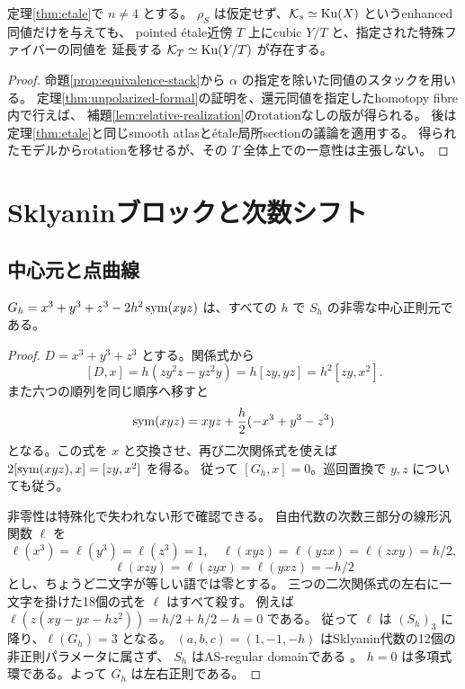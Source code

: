 \begin{corollary}[rotationを指定しない局所的存在]\label{cor:etale-unpolarized}
 定理\ref{thm:etale}で \(n\ne4\) とする。
 \(\rho_S\) は仮定せず、\(\mathcal K_s\simeq\operatorname{Ku}(X)\) というenhanced同値だけを与えても、
 pointed étale近傍 \(T\) 上にcubic \(Y/T\) と、指定された特殊ファイバーの同値を
 延長する \(\mathcal K_T\simeq\operatorname{Ku}(Y/T)\) が存在する。
\end{corollary}
\begin{proof}
 命題\ref{prop:equivalence-stack}から \(\alpha\) の指定を除いた同値のスタックを用いる。
 定理\ref{thm:unpolarized-formal}の証明を、還元同値を指定したhomotopy fibre内で行えば、
 補題\ref{lem:relative-realization}のrotationなしの版が得られる。
 後は定理\ref{thm:etale}と同じsmooth atlasとétale局所sectionの議論を適用する。
 得られたモデルからrotationを移せるが、その \(T\) 全体上での一意性は主張しない。
\end{proof}

\section{Sklyaninブロックと次数シフト}\label{sec:elliptic}

\subsection{中心元と点曲線}

\begin{lemma}\label{lem:center}
 \(G_h=x^3+y^3+z^3-2h^2\operatorname{sym}(xyz)\) は、すべての \(h\) で
 \(S_h\) の非零な中心正則元である。
\end{lemma}
\begin{proof}
 \(D=x^3+y^3+z^3\) とする。関係式から
 \[
 [D,x]=h(zy^2z-yz^2y)=h[zy,yz]=h^2[zy,x^2].
 \]
 また六つの順列を同じ順序へ移すと
 \[
 \operatorname{sym}(xyz)=xyz+\frac h2(-x^3+y^3-z^3)
 \]
 となる。この式を \(x\) と交換させ、再び二次関係式を使えば
 \(2[\operatorname{sym}(xyz),x]=[zy,x^2]\) を得る。
 従って \([G_h,x]=0\)。巡回置換で \(y,z\) についても従う。

 非零性は特殊化で失われない形で確認できる。
 自由代数の次数三部分の線形汎関数 \(\ell\) を
 \[
 \ell(x^3)=\ell(y^3)=\ell(z^3)=1,\quad
 \ell(xyz)=\ell(yzx)=\ell(zxy)=h/2,
 \]
 \[
 \ell(xzy)=\ell(zyx)=\ell(yxz)=-h/2
 \]
 とし、ちょうど二文字が等しい語では零とする。
 三つの二次関係式の左右に一文字を掛けた18個の式を \(\ell\) はすべて殺す。
 例えば \(\ell(z(xy-yx-hz^2))=h/2+h/2-h=0\) である。
 従って \(\ell\) は \((S_h)_3\) に降り、\(\ell(G_h)=3\) となる。
 \((a,b,c)=(1,-1,-h)\) はSklyanin代数の12個の非正則パラメータに属さず、
 \(S_h\) はAS-regular domainである \cite[Introduction]{CGWZ}。
 \(h=0\) は多項式環である。よって \(G_h\) は左右正則である。
\end{proof}

